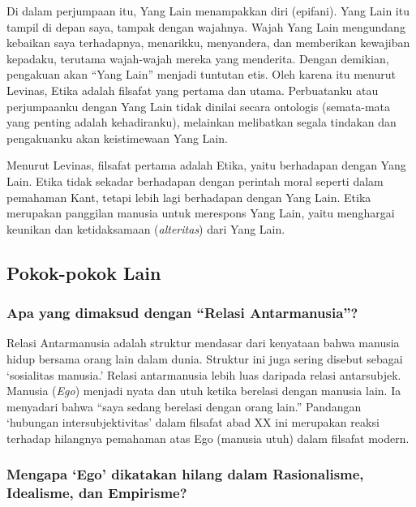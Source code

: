 \documentclass[11pt,twoside,a5paper,openany]{memoir}
\begin{document}
Di dalam perjumpaan itu, Yang Lain menampakkan diri (epifani). Yang Lain
itu tampil di depan saya, tampak dengan wajahnya. Wajah Yang Lain
mengundang kebaikan saya terhadapnya, menarikku, menyandera, dan
memberikan kewajiban kepadaku, terutama wajah-wajah mereka yang
menderita. Dengan demikian, pengakuan akan ``Yang Lain'' menjadi
tuntutan etis. Oleh karena itu menurut Levinas, Etika adalah filsafat
yang pertama dan utama. Perbuatanku atau perjumpaanku dengan Yang Lain
tidak dinilai secara ontologis (semata-mata yang penting adalah
kehadiranku), melainkan melibatkan segala tindakan dan pengakuanku akan
keistimewaan Yang Lain.

Menurut Levinas, filsafat pertama adalah Etika, yaitu berhadapan dengan
Yang Lain. Etika tidak sekadar berhadapan dengan perintah moral seperti
dalam pemahaman Kant, tetapi lebih lagi berhadapan dengan Yang Lain.
Etika merupakan panggilan manusia untuk merespons Yang Lain, yaitu
menghargai keunikan dan ketidaksamaan (\emph{alteritas}) dari Yang Lain.

\hypertarget{pokok-pokok-lain}{%
\subsection{Pokok-pokok Lain}\label{pokok-pokok-lain}}

\hypertarget{apa-yang-dimaksud-dengan-relasi-antarmanusia}{%
\subsubsection{Apa yang dimaksud dengan ``Relasi
Antarmanusia''?}\label{apa-yang-dimaksud-dengan-relasi-antarmanusia}}

Relasi Antarmanusia adalah struktur mendasar dari kenyataan bahwa
manusia hidup bersama orang lain dalam dunia. Struktur ini juga sering
disebut sebagai `sosialitas manusia.' Relasi antarmanusia lebih luas
daripada relasi antarsubjek. Manusia (\emph{Ego}) menjadi nyata dan utuh
ketika berelasi dengan manusia lain. Ia menyadari bahwa ``saya sedang
berelasi dengan orang lain.'' Pandangan `hubungan intersubjektivitas'
dalam filsafat abad XX ini merupakan reaksi terhadap hilangnya pemahaman
atas Ego (manusia utuh) dalam filsafat modern.

\hypertarget{mengapa-ego-dikatakan-hilang-dalam-rasionalisme-idealisme-dan-empirisme}{%
\subsubsection{Mengapa `Ego' dikatakan hilang dalam Rasionalisme,
Idealisme, dan
Empirisme?}\label{mengapa-ego-dikatakan-hilang-dalam-rasionalisme-idealisme-dan-empirisme}}
\end{document}
